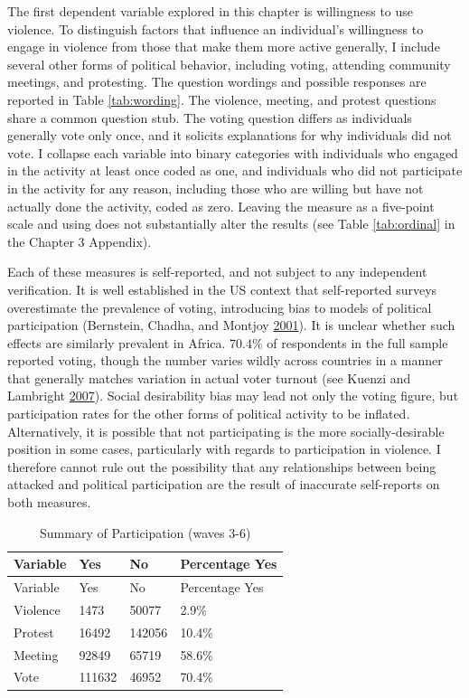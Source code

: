 \documentclass[12pt,]{book}
\theoremstyle{definition}
\theoremstyle{definition}
\theoremstyle{definition}
\theoremstyle{remark}
\begin{document}
The first dependent variable explored in this chapter is willingness to
use violence. To distinguish factors that influence an individual's
willingness to engage in violence from those that make them more active
generally, I include several other forms of political behavior,
including voting, attending community meetings, and protesting. The
question wordings and possible responses are reported in Table
\ref{tab:wording}. The violence, meeting, and protest questions share a
common question stub. The voting question differs as individuals
generally vote only once, and it solicits explanations for why
individuals did not vote. I collapse each variable into binary
categories with individuals who engaged in the activity at least once
coded as one, and individuals who did not participate in the activity
for any reason, including those who are willing but have not actually
done the activity, coded as zero. Leaving the measure as a five-point
scale and using does not substantially alter the results (see Table
\ref{tab:ordinal} in the Chapter 3 Appendix).

Each of these measures is self-reported, and not subject to any
independent verification. It is well established in the US context that
self-reported surveys overestimate the prevalence of voting, introducing
bias to models of political participation (Bernstein, Chadha, and
Montjoy \protect\hyperlink{ref-Bernstein2001}{2001}). It is unclear
whether such effects are similarly prevalent in Africa. 70.4\% of
respondents in the full sample reported voting, though the number varies
wildly across countries in a manner that generally matches variation in
actual voter turnout (see Kuenzi and Lambright
\protect\hyperlink{ref-Kuenzi2007}{2007}). Social desirability bias may
lead not only the voting figure, but participation rates for the other
forms of political activity to be inflated. Alternatively, it is
possible that not participating is the more socially-desirable position
in some cases, particularly with regards to participation in violence. I
therefore cannot rule out the possibility that any relationships between
being attacked and political participation are the result of inaccurate
self-reports on both measures.

\begin{longtable}[]{@{}llll@{}}
\caption{\label{tab:descriptive} Summary of Participation (waves
3-6)}\tabularnewline
\toprule
Variable & Yes & No & Percentage Yes\tabularnewline
\midrule
\endfirsthead
\toprule
Variable & Yes & No & Percentage Yes\tabularnewline
\midrule
\endhead
Violence & 1473 & 50077 & 2.9\%\tabularnewline
Protest & 16492 & 142056 & 10.4\%\tabularnewline
Meeting & 92849 & 65719 & 58.6\%\tabularnewline
Vote & 111632 & 46952 & 70.4\%\tabularnewline
\bottomrule
\end{longtable}
\end{document}
